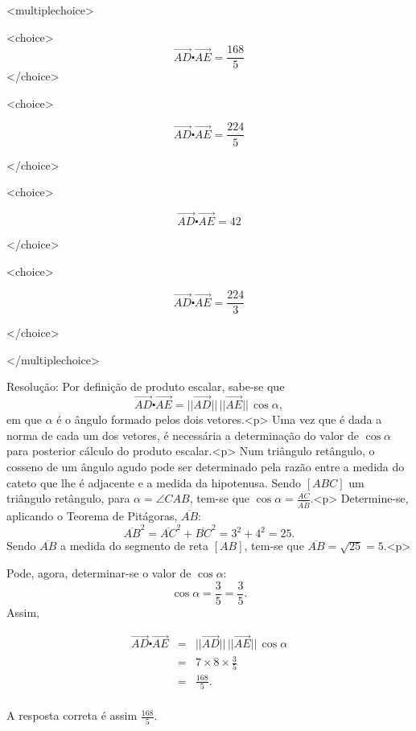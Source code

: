 \documentclass{article}
\begin{document}
<multiplechoice>

<choice>
$$  \overrightarrow{AD} \centerdot \overrightarrow{AE}=\frac{168}{5}  $$
</choice>

<choice>

$$ \overrightarrow{AD} \centerdot \overrightarrow{AE}=\frac{224}{5} $$

</choice>

<choice>

$$ \overrightarrow{AD} \centerdot \overrightarrow{AE}=42 $$

</choice>

<choice>

$$ \overrightarrow{AD} \centerdot \overrightarrow{AE}=\frac{224}{3} $$

</choice>

</multiplechoice>


Resolução:
Por definição de produto escalar, sabe-se que
$$ \overrightarrow{AD} \centerdot \overrightarrow{AE}=||\overrightarrow{AD}|| \, ||\overrightarrow{AE}|| \, \cos\alpha,$$
em que $\alpha$ é o ângulo formado pelos dois vetores.<p>
Uma vez que é dada a norma de cada um dos vetores, é necessária a determinação do valor de $\cos\alpha$ para posterior cálculo do produto escalar.<p>
Num triângulo retângulo, o cosseno de um ângulo agudo pode ser determinado pela razão entre a medida do cateto que lhe é adjacente e a medida da hipotenusa. Sendo $[ABC]$ um triângulo retângulo, para $\alpha=\angle CAB$, tem-se que $\displaystyle \cos \alpha =\frac{\overline{AC}}{\overline{AB}}$.<p> Determine-se, aplicando o Teorema de Pitágoras, $\overline{AB}$:
    $$\overline{AB}^2=\overline{AC}^2+\overline{BC}^2=3^2+4^2= 25.$$
Sendo $\overline{AB}$ a medida do segmento de reta $[AB]$, tem-se que $\overline{AB}=\sqrt{25}=5$.<p>

Pode, agora, determinar-se o valor de $\cos\alpha$:
    $$\cos\alpha=\frac{3}{5}=\frac{3}{5}.$$
Assim,


\begin{eqnarray*}
    \overrightarrow{AD} \centerdot \overrightarrow{AE}&=& ||\overrightarrow{AD}|| \,||\overrightarrow{AE}|| \, \cos\alpha \\
                                           &=& 7 \times 8\times \frac{3}{5} \\
                                           &=& \frac{168}{5}. \\
\end{eqnarray*} 

A resposta correta é assim $\displaystyle \frac{168}{5}$.
\end{document}
